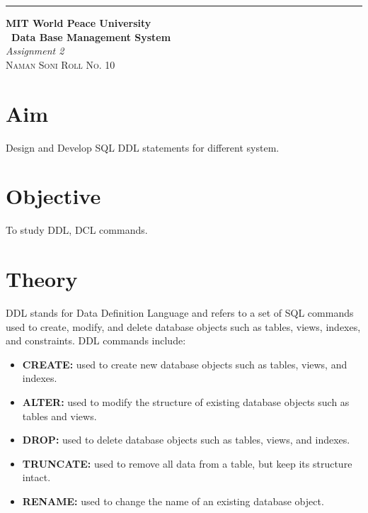 \documentclass{article}
\begin{document}
\begin{titlepage} %
		
		\raggedleft\rule{1pt}{\textheight} %
		\hspace{0.05\textwidth} %
		\parbox[b]{0.75\textwidth}
		{ %
			
			{\Huge\bfseries MIT World Peace University \\[0.5\baselineskip] \ Data Base Management System}\\[2\baselineskip] %
			{\large\textit{Assignment 2}}\\[4\baselineskip] %
			{\Large\textsc{Naman Soni Roll No. 10}} %
			
			\vspace{0.5\textheight} %
		}
		
\end{titlepage}
\tableofcontents
\pagebreak
\section{\textbf{Aim}}
Design and Develop SQL DDL statements for different system.
\section{\textbf{Objective}}
To study DDL, DCL commands.
\section{\textbf{Theory}}
DDL stands for Data Definition Language and refers to a set of SQL commands used to create, modify, and delete database objects such as tables, views, indexes, and constraints. DDL commands include:
\begin{itemize}
    \item \textbf{CREATE:} used to create new database objects such as tables, views, and indexes.
    \item \textbf{ALTER:} used to modify the structure of existing database objects such as tables and views.
    \item \textbf{DROP:} used to delete database objects such as tables, views, and indexes.
    \item \textbf{TRUNCATE:} used to remove all data from a table, but keep its structure intact.
    \item \textbf{RENAME:} used to change the name of an existing database object.
\end{itemize}
\end{document}
